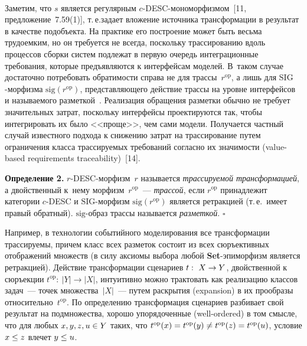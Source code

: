 \begin{multicols}{2}
 \begin{center}
 \mbox{%
 \epsfxsize=50.393mm
 }
 \end{center}


 Заметим, что $s$ является регулярным $c$-DESC-мо\-но\-мор\-физ\-мом~[11,
предложение~7.59(1)], т.\,е.\linebreak задает вложение источника трансформации в
результат в качестве подобъекта. На практике его по\-стро\-е\-ние может быть
весьма трудоемким, но он требует\-ся не всегда, поскольку трассированию вдоль
процессов сборки систем подлежат в первую очередь интеграционные
требования, которые предъявляются к интерфейсам моделей. В~таком случае
достаточно потребовать обратимости справа не для трассы~$r^{\mathrm{op}}$, а
лишь для $\mathrm{SIG}$-мор\-физ\-ма $\mathrm{sig}(r^{\mathrm{op}})$, пред\-став\-ля\-юще\-го действие
трассы на уровне интерфейсов и называемого разметкой~\cite{12-kov}.
Реализация обращения разметки обычно не требует значительных затрат,
поскольку интерфейсы проектируются так, чтобы интегрировать их было
<<проще>>, чем сами модели. Получается частный случай известного подхода
к снижению затрат на трассирование путем ограничения класса трассируемых
требований согласно их значимости (value-based requirements traceability)~[14].

 \smallskip

 \noindent
 \textbf{Определение 2.} $r$-DESC-мор\-физм~$r$ называется
\textit{трассируемой трансформацией}, а двойственный к~не\-му
морфизм~$r^{\mathrm{op}}$~--- \textit{трассой}, если $r^{\mathrm{op}}$
принадлежит категории $c$-DESC и $\mathrm{SIG}$-мор\-физм $\mathrm{sig}(r^{\mathrm{op}})$
является ретракцией (т.\,е.\ имеет правый обратный). $\mathrm{sig}$-об\-раз трассы
называется \textit{разметкой}. \hfill$\square$

 \smallskip

 Например, в технологии событийного моделирования все трансформации
трассируемы, причем класс всех разметок состоит из всех сюръективных
отображений множеств (в силу аксиомы выбора любой
 \textbf{Set}-эпи\-мор\-физм является ретракцией). Действие трансформации
сценариев $t:\ X \hm\to Y$, двойственной к сюръекции $t^{\mathrm{op}}:\
\vert Y\vert \to \vert X\vert$, интуитивно можно трактовать как реализацию классов
задач~--- точек множества~$\vert X\vert$~--- путем раскрытия (expansion) в их
прообразы относительно~$t^{\mathrm{op}}$. По определению трансформация
сценариев разбивает свой результат на подмножества, хорошо упорядоченные
(well-ordered) в том смысле, что для любых $x, y, z, u \hm\in Y$ таких, что
$t^{\mathrm{op}}(x) \hm= t^{\mathrm{op}}(y) \not= t^{\mathrm{op}}(z) \hm=
t^{\mathrm{op}}(u)$, условие $x \hm\leq z$ влечет $y \hm\leq u$.


\end{multicols}
